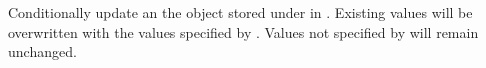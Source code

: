 Conditionally update an the object stored under  in .
Existing values will be overwritten with the values specified by .
Values not specified by  will remain unchanged.



